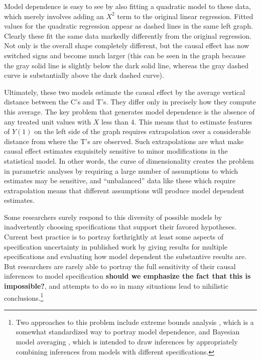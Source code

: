 \documentclass[11pt,titlepage]{article}
\begin{document}
Model dependence is easy to see by also fitting a quadratic model to
these data, which merely involves adding an $X^2$ term to the original
linear regression.  Fitted values for the quadratic regression appear
as dashed lines in the same left graph.  Clearly these fit the same
data markedly differently from the original regression.  Not only is
the overall shape completely different, but the causal effect has now
switched signs and become much larger (this can be seen in the graph
because the gray solid line is slightly below the dark solid line,
whereas the gray dashed curve is substantially above the dark dashed
curve).

Ultimately, these two models estimate the causal effect by the average
vertical distance between the C's and T's.  They differ only in
precisely how they compute this average.  The key problem that
generates model dependence is the absence of any treated unit values
with $X$ less than 4.  This means that to estimate features of $Y(1)$
on the left side of the graph requires extrapolation over a
considerable distance from where the T's are observed.  Such
extrapolations are what make causal effect estimates exquisitely
sensitive to minor modifications in the statistical model.  In other
words, the curse of dimensionality creates the problem in parametric
analyses by requiring a large number of assumptions to which estimates
may be sensitive, and ``unbalanced'' data like these which require
extrapolation means that different assumptions will produce model
dependent estimates.

Some researchers surely respond to this diversity of possible models
by inadvertently choosing specifications that support their favored
hypotheses.  Current best practice is to portray forthrightly at least
some aspects of specification uncertainty in published work by giving
results for multiple specifications and evaluating how model dependent
the substantive results are.  But researchers are rarely able to
portray the full sensitivity of their causal inferences to model
specification {\bf should we emphasize the fact that this is
  impossible?}, and attempts to do so in many situations lead to
nihilistic conclusions.\footnote{Two approaches to this problem
  include extreme bounds analysis \citep{Leamer78}, which is a
  somewhat standardized way to portray model dependence, and Bayesian
  model averaging \citep{HoeMadRaf99,ImaKin04}, which is intended to
  draw inferences by appropriately combining inferences from models
  with different specifications.}
\end{document}
